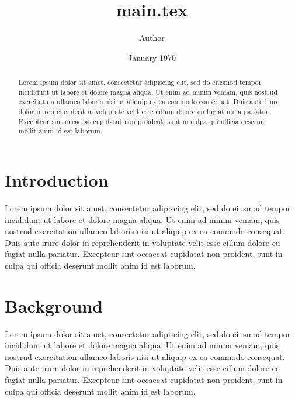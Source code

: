 \documentclass[12pt]{article}
\begin{document}
\title{main.tex}
\author{Author}
\date{January 1970}
\maketitle

\begin{abstract}
  Lorem ipsum dolor sit amet, consectetur adipiscing elit, sed do eiusmod 
  tempor incididunt ut labore et dolore magna aliqua. Ut enim ad minim veniam, 
  quis nostrud exercitation ullamco laboris nisi ut aliquip ex ea commodo 
  consequat. Duis aute irure dolor in reprehenderit in voluptate velit esse 
  cillum dolore eu fugiat nulla pariatur. Excepteur sint occaecat cupidatat non 
  proident, sunt in culpa qui officia deserunt mollit anim id est laborum.
\end{abstract}

\section{Introduction}
  Lorem ipsum dolor sit amet, consectetur adipiscing elit, sed do eiusmod 
  tempor incididunt ut labore et dolore magna aliqua. Ut enim ad minim veniam, 
  quis nostrud exercitation ullamco laboris nisi ut aliquip ex ea commodo 
  consequat. Duis aute irure dolor in reprehenderit in voluptate velit esse 
  cillum dolore eu fugiat nulla pariatur. Excepteur sint occaecat cupidatat non 
  proident, sunt in culpa qui officia deserunt mollit anim id est laborum. 
  \cite{latex2e}

\section{Background} 
  Lorem ipsum dolor sit amet, consectetur adipiscing elit, sed do eiusmod 
  tempor incididunt ut labore et dolore magna aliqua. Ut enim ad minim veniam, 
  quis nostrud exercitation ullamco laboris nisi ut aliquip ex ea commodo 
  consequat. Duis aute irure dolor in reprehenderit in voluptate velit esse 
  cillum dolore eu fugiat nulla pariatur. Excepteur sint occaecat cupidatat non 
  proident, sunt in culpa qui officia deserunt mollit anim id est laborum. 
  \cite{texbook}



\end{document}
